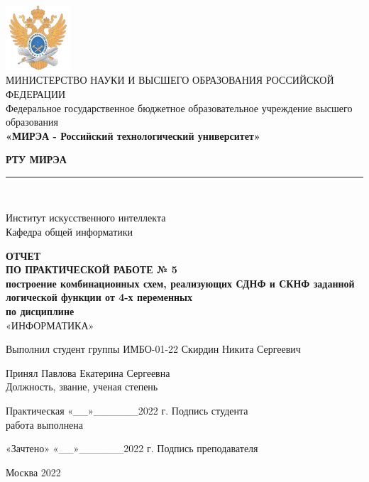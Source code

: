 \documentclass[14pt, a4paper]{extreport}
\newcommand{\doublerule}[1][.4pt]{%
	\noindent
	\makebox[0pt][l]{\rule[.6ex]{\linewidth}{#1}}%
	\rule[.3ex]{\linewidth}{#1}
}
\begin{document}
\begin{titlepage}
	\begin{center}
		\vspace*{0.5mm}

		\includegraphics[width=0.18\textwidth]{logo}\\
		\footnotesize
		МИНИСТЕРСТВО НАУКИ И ВЫСШЕГО ОБРАЗОВАНИЯ РОССИЙСКОЙ ФЕДЕРАЦИИ\\
		\small
		Федеральное государственное бюджетное образовательное учреждение высшего образования\\
		\textbf{«МИРЭА - Российский технологический университет»}
		\vspace{0.5cm}

		\large \textbf{РТУ МИРЭА} \normalsize

		\doublerule[1pt]\\
		\vspace{0.4cm}

		Институт искусственного интеллекта\\
		Кафедра общей информатики
		\vspace{1.5cm}

		\textbf{ОТЧЕТ}\\
		\textbf{ПО ПРАКТИЧЕСКОЙ РАБОТЕ № 5}\\
		\textbf{построение комбинационных схем, реализующих СДНФ и СКНФ заданной логической функции от 4-х переменных}\\
		\textbf{по дисциплине}\\
		«ИНФОРМАТИКА»
		\vspace{1.5cm}

		\small
		Выполнил студент группы ИМБО-01-22 \hfill Скирдин Никита Сергеевич
		\vspace{1cm}

		Принял \hfill Павлова Екатерина Сергеевна\\
		Должность, звание, ученая степень \hfill
		\vspace{1.5cm}

		\footnotesize
		\hspace{0.5cm} Практическая \hfill «\_\_»\_\_\_\_\_\_2022 г. \hfill Подпись студента\\
		\hspace{0.5cm} работа выполнена \hfill
		\vspace{0.5cm}

		\hspace{2cm} «Зачтено» \hfill «\_\_»\_\_\_\_\_\_2022 г. \hfill Подпись преподавателя
		\vfill

		\small
		Москва 2022
	\end{center}
	\thispagestyle{empty}
\end{titlepage}
\end{document}
